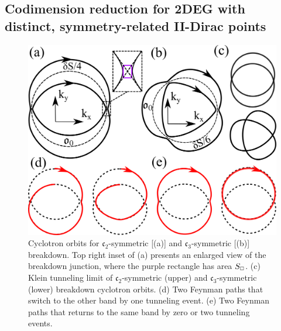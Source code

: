 \documentclass[aps, prb, showpacs, twocolumn, notitlepage, superscriptaddress]{revtex4-1}
\begin{document}


\subsection{Codimension reduction for 2DEG with distinct, symmetry-related II-Dirac points}\label{sec:rotsymmbreakdown}

\begin{figure}
\includegraphics[width=1.0\columnwidth]{Cn-breakdown.png}
\caption{Cyclotron orbits for $\mathfrak{c}_2$-symmetric [(a)] and $\mathfrak{c}_3$-symmetric [(b)] breakdown. Top right inset of (a) presents an enlarged view of the breakdown junction, where the purple rectangle has area $S_{\scriptscriptstyle{\square}}$. (c) Klein tunneling limit of $\mathfrak{c}_2$-symmetric (upper) and $\mathfrak{c}_3$-symmetric (lower) breakdown cyclotron orbits. (d) Two Feynman paths that switch to the other band by one tunneling event. (e) Two Feynman paths that returns to the same band by zero or two tunneling events. \label{fig:Cn-breakdown}}
\end{figure}
\end{document}
